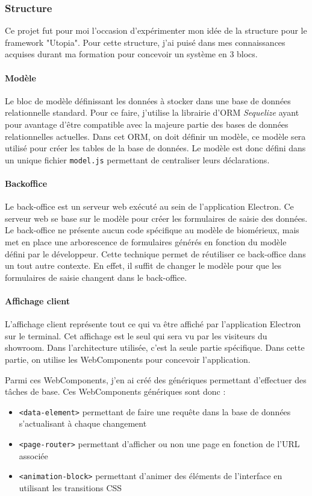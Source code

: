 \documentclass{article}
\begin{document}
\subsubsection{Structure}

Ce projet fut pour moi l'occasion d'expérimenter mon idée de la structure pour le framework "Utopia".
Pour cette structure, j'ai puisé dans mes connaissances acquises durant ma formation pour concevoir un système en 3 blocs.

\paragraph{Modèle} Le bloc de modèle définissant les données à stocker dans une base de données relationnelle standard.
Pour ce faire, j'utilise la librairie d'ORM \emph{Sequelize} ayant pour avantage d'être compatible avec la majeure partie des bases de données relationnelles actuelles.
Dans cet ORM, on doit définir un modèle, ce modèle sera utilisé pour créer les tables de la base de données.
Le modèle est donc défini dans un unique fichier \texttt{model.js} permettant de centraliser leurs déclarations.

\paragraph{Backoffice} Le back-office est un serveur web exécuté au sein de l'application Electron.
Ce serveur web se base sur le modèle pour créer les formulaires de saisie des données.
Le back-office ne présente aucun code spécifique au modèle de biomérieux, mais met en place une arborescence de formulaires générés en fonction du modèle défini par le développeur.
Cette technique permet de réutiliser ce back-office dans un tout autre contexte.
En effet, il suffit de changer le modèle pour que les formulaires de saisie changent dans le back-office.

\paragraph{Affichage client} L'affichage client représente tout ce qui va être affiché par l'application Electron sur le terminal.
Cet affichage est le seul qui sera vu par les visiteurs du showroom.
Dans l'architecture utilisée, c'est la seule partie spécifique.
Dans cette partie, on utilise les WebComponents pour concevoir l'application.

Parmi ces WebComponents, j'en ai créé des génériques permettant d'effectuer des tâches de base.
Ces WebComponents génériques sont donc :
\begin{itemize}
    \item \texttt{<data-element>} permettant de faire une requête dans la base de données s'actualisant à chaque changement
    \item \texttt{<page-router>} permettant d'afficher ou non une page en fonction de l'URL associée
    \item \texttt{<animation-block>} permettant d'animer des éléments de l'interface en utilisant les transitions CSS
\end{itemize}
\end{document}
